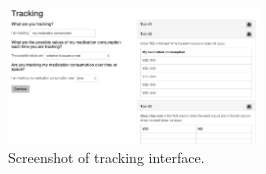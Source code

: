 \documentclass{sig-alternate}
\begin{document}





\begin{figure}
\centering
\includegraphics[width=250px]{img/tracking-screen.png}
\caption{Screenshot of tracking interface.}
\label{fig:tracking}
\end{figure}
\end{document}
